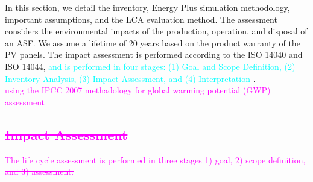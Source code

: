 
In this section, we detail the inventory, Energy Plus simulation methodology, important assumptions, and the LCA evaluation method. The assessment considers the environmental impacts of the production, operation, and disposal of an ASF. We assume a lifetime of 20 years based on the product warranty of the PV panels. The impact assessment is performed according to the ISO 14040 and ISO 14044, \textcolor{cyan}{and is performed in four stages: (1) Goal and Scope Definition, (2) Inventory Analysis, (3) Impact Assessment, and (4) Interpretation} \cite{finkbeiner2006new}.\\\textcolor{magenta}{\sout{using the IPCC 2007 methadology for global warming potential (GWP) assessment}}


\subsection{\textcolor{magenta}{\sout{ Impact Assessment}}}
\textcolor{magenta}{\sout{The life cycle assessment is performed in three stages 1) goal, 2) scope definition, and 3) assessment.}}

